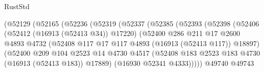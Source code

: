 \begin{lexlean}{RustStd}
\begin{coremodule}
                                      (@52129
                                        (@52165
                                          (@52236
                                            (@52319
                                              (@52337
                                                (@52385
                                                  (@52393
                                                    (@52398
                                                      (@52406
                                                        (@52412 (@16913 (@52413 @34)) @17220)
                                                        (@52400
                                                          @286
                                                          @211
                                                          @17
                                                          @2600
                                                          @4893
                                                          @4732
                                                          (@52408
                                                            @117
                                                            @17
                                                            @117
                                                            @4893
                                                            (@16913 (@52413 @117))
                                                            @18897)
                                                          (@52400
                                                            @209
                                                            @104
                                                            @2523
                                                            @14
                                                            @4730
                                                            @4517
                                                            (@52408
                                                              @183
                                                              @2523
                                                              @183
                                                              @4730
                                                              (@16913 (@52413 @183))
                                                              @17889)
                                                            (@16930 @52341 @4333)))))
                                                    @49740
                                                    @49743

\end{coremodule}
\end{lexlean}
